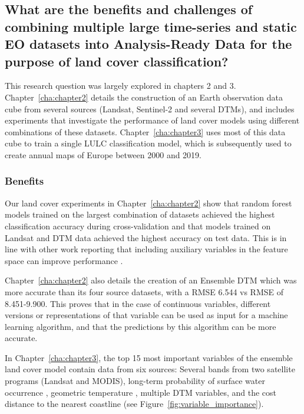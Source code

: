     \subsection{What are the benefits and challenges of combining multiple large time-series and static EO datasets into Analysis-Ready Data for the purpose of land cover classification?}
    \label{syn:rq1}

        This research question was largely explored in chapters 2 and 3. Chapter\@~\ref{cha:chapter2} details the construction of an Earth observation data cube from several sources (Landsat, Sentinel-2 and several DTMs), and includes experiments that investigate the performance of land cover models using different combinations of these datasets. Chapter\@~\ref{cha:chapter3} uses most of this data cube to train a single LULC classification model, which is subsequently used to create annual maps of Europe between 2000 and 2019. 

        \subsubsection{Benefits}
    
            Our land cover experiments in Chapter\@~\ref{cha:chapter2} show that random forest models trained on the largest combination of datasets achieved the highest classification accuracy during cross-validation and that models trained on Landsat and DTM data achieved the highest accuracy on test data. This is in line with other work reporting that including auxiliary variables in the feature space can improve performance \citep{zhu2016optimizing, hurskainen2019auxiliary, hosseiny2022urban, santos2012multiscale}.

            Chapter\@~\ref{cha:chapter2} also details the creation of an Ensemble DTM which was more accurate than its four source datasets, with a RMSE 6.544 vs RMSE of 8.451-9.900. This proves that in the case of continuous variables, different versions or representations of that variable can be used as input for a machine learning algorithm, and that the predictions by this algorithm can be more accurate.
            
            In Chapter\@~\ref{cha:chapter3}, the top 15 most important variables of the ensemble land cover model contain data from six sources: Several bands from two satellite programs (Landsat and MODIS), long-term probability of surface water occurrence \citep{pekel2016high}, geometric temperature \citep{kilibarda2014spatio}, multiple DTM variables, and the cost distance to the nearest coastline (see Figure~\ref{fig:variable_importance}). 
    
